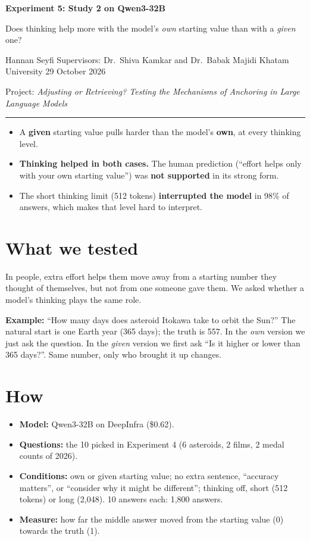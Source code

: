 \documentclass[11pt,a4paper]{article}
\newcommand{\inshort}[1]{\begin{tcolorbox}[colback=gray!6,colframe=gray!50,title=\textbf{In short},fonttitle=\normalsize]#1\end{tcolorbox}}
\newcommand{\header}[3]{%
  {\Large\textbf{#1}}\par\smallskip
  {\large #2}\par\smallskip
  {\small Hannan Seyfi \textperiodcentered{} Supervisors: Dr.\ Shiva Kamkar and Dr.\ Babak Majidi \textperiodcentered{} Khatam University \textperiodcentered{} #3}\par
  {\small Project: \emph{Adjusting or Retrieving? Testing the Mechanisms of Anchoring in Large Language Models}}\par\medskip\hrule\medskip}
\begin{document}
\header{Experiment 5: Study 2 on Qwen3-32B}{Does thinking help more with the model's \emph{own} starting value than with a \emph{given} one?}{29 October 2026}

\inshort{\begin{itemize}[leftmargin=*]
  \item A \textbf{given} starting value pulls harder than the model's \textbf{own}, at every thinking level.
  \item \textbf{Thinking helped in both cases.} The human prediction (\enquote{effort helps only with your own starting value}) was \textbf{not supported} in its strong form.
  \item The short thinking limit (512 tokens) \textbf{interrupted the model} in 98\% of answers, which makes that level hard to interpret.
\end{itemize}}

\section*{What we tested}
In people, extra effort helps them move away from a starting number they thought of themselves, but not from one someone gave them. We asked whether a model's thinking plays the same role.

\textbf{Example:} \enquote{How many days does asteroid Itokawa take to orbit the Sun?} The natural start is one Earth year (365 days); the truth is 557. In the \emph{own} version we just ask the question. In the \emph{given} version we first ask \enquote{Is it higher or lower than 365 days?}. Same number, only who brought it up changes.

\section*{How}
\begin{itemize}[leftmargin=*]
  \item \textbf{Model:} Qwen3-32B on DeepInfra (\$0.62).
  \item \textbf{Questions:} the 10 picked in Experiment 4 (6 asteroids, 2 films, 2 medal counts of 2026).
  \item \textbf{Conditions:} own or given starting value; no extra sentence, \enquote{accuracy matters}, or \enquote{consider why it might be different}; thinking off, short (512 tokens) or long (2,048). 10 answers each: 1,800 answers.
  \item \textbf{Measure:} how far the middle answer moved from the starting value (0) towards the truth (1).
\end{itemize}
\end{document}

